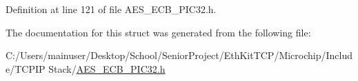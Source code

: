 Definition at line 121 of file A\+E\+S\+\_\+\+E\+C\+B\+\_\+\+P\+I\+C32.\+h.



The documentation for this struct was generated from the following file\+:\begin{DoxyCompactItemize}
\item 
C\+:/\+Users/mainuser/\+Desktop/\+School/\+Senior\+Project/\+Eth\+Kit\+T\+C\+P/\+Microchip/\+Include/\+T\+C\+P\+I\+P Stack/\hyperlink{_a_e_s___e_c_b___p_i_c32_8h}{A\+E\+S\+\_\+\+E\+C\+B\+\_\+\+P\+I\+C32.\+h}\end{DoxyCompactItemize}
